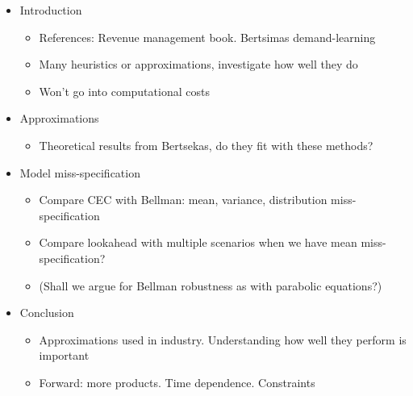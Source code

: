 \documentclass[main.tex]{subfiles}
\begin{document}
\listoftodos

\begin{itemize}
\item Introduction
  \begin{itemize}
  \item References: Revenue management book. Bertsimas demand-learning
  \item Many heuristics or approximations, investigate how well they
    do
  \item Won't go into computational costs
  \end{itemize}
\item Approximations
  \begin{itemize}
  \item Theoretical results from Bertsekas, do they fit with these methods?
  \end{itemize}
\item Model miss-specification
  \begin{itemize}
  \item Compare CEC with Bellman: mean, variance, distribution
    miss-specification
  \item Compare lookahead with multiple scenarios when we have mean miss-specification?
  \item (Shall we argue for Bellman robustness as with parabolic equations?)
  \end{itemize}
\item Conclusion
  \begin{itemize}
  \item Approximations used in industry. Understanding how well they
    perform is important
  \item Forward: more products. Time dependence. Constraints
  \end{itemize}
\end{itemize}
\end{document}
